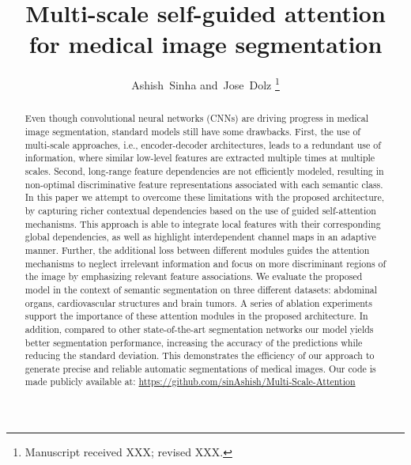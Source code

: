 \documentclass[journal]{IEEEtran}
\begin{document}
\title{Multi-scale self-guided attention for medical image segmentation} 






\author{Ashish~Sinha
 and~Jose~Dolz 
\thanks{Manuscript received XXX; revised XXX.}}





\maketitle
\begin{abstract}


Even though convolutional neural networks (CNNs) are driving progress in medical image segmentation, standard models still have some drawbacks. First, the use of multi-scale approaches, i.e., encoder-decoder architectures, leads to a redundant use of information, where similar low-level features are extracted multiple times at multiple scales. Second, long-range feature dependencies are not efficiently modeled, resulting in non-optimal discriminative feature representations associated with each semantic class. In this paper we attempt to overcome these limitations with the proposed architecture, by capturing richer contextual dependencies based on the use of guided self-attention mechanisms. This approach is able to integrate local features with their corresponding global dependencies, as well as highlight interdependent channel maps in an adaptive manner. Further, the additional loss between different modules guides the attention mechanisms to neglect irrelevant information and focus on more discriminant regions of the image by emphasizing relevant feature associations. We evaluate the proposed model in the context of semantic segmentation on three different datasets: abdominal organs, cardiovascular structures and brain tumors. A series of ablation experiments support the importance of these attention modules in the proposed architecture. In addition, compared to other state-of-the-art segmentation networks our model yields better segmentation performance, increasing the accuracy of the predictions while reducing the standard deviation. This demonstrates the efficiency of our approach to generate precise and reliable automatic segmentations of medical images. Our code is made publicly available at: \textcolor{black}{\href{https://github.com/sinAshish/Multi-Scale-Attention}{https://github.com/sinAshish/Multi-Scale-Attention}}




\end{abstract}
\end{document}
